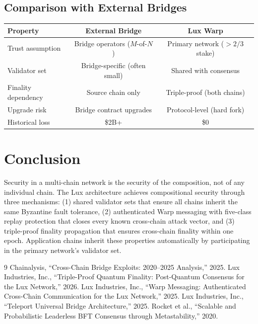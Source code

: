 \documentclass[11pt,a4paper]{article}
\begin{document}
\subsection{Comparison with External Bridges}

\begin{center}
\begin{tabular}{lcc}
\toprule
\textbf{Property} & \textbf{External Bridge} & \textbf{Lux Warp} \\
\midrule
Trust assumption & Bridge operators ($M$-of-$N$) & Primary network ($>2/3$ stake) \\
Validator set & Bridge-specific (often small) & Shared with consensus \\
Finality dependency & Source chain only & Triple-proof (both chains) \\
Upgrade risk & Bridge contract upgrades & Protocol-level (hard fork) \\
Historical loss & \$2B+ & \$0 \\
\bottomrule
\end{tabular}
\end{center}

\section{Conclusion}

Security in a multi-chain network is the security of the composition, not of any individual chain. The Lux architecture achieves compositional security through three mechanisms: (1) shared validator sets that ensure all chains inherit the same Byzantine fault tolerance, (2) authenticated Warp messaging with five-class replay protection that closes every known cross-chain attack vector, and (3) triple-proof finality propagation that ensures cross-chain finality within one epoch. Application chains inherit these properties automatically by participating in the primary network's validator set.

\begin{thebibliography}{9}
 Chainalysis, ``Cross-Chain Bridge Exploits: 2020--2025 Analysis,'' 2025.
 Lux Industries, Inc., ``Triple-Proof Quantum Finality: Post-Quantum Consensus for the Lux Network,'' 2026.
 Lux Industries, Inc., ``Warp Messaging: Authenticated Cross-Chain Communication for the Lux Network,'' 2025.
 Lux Industries, Inc., ``Teleport Universal Bridge Architecture,'' 2025.
 Rocket et al., ``Scalable and Probabilistic Leaderless BFT Consensus through Metastability,'' 2020.
\end{thebibliography}
\end{document}
